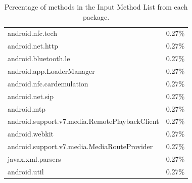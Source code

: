\documentclass{sig-alternate}
\begin{document}
\begin{table}
\begin{tabular}{|l|l|}
android.nfc.tech & 0.27\% \\ 
android.net.http & 0.27\% \\ 
android.bluetooth.le & 0.27\% \\ 
android.app.LoaderManager & 0.27\% \\ 
android.nfc.cardemulation & 0.27\% \\ 
android.net.sip & 0.27\% \\ 
android.mtp & 0.27\% \\ 
android.support.v7.media.RemotePlaybackClient & 0.27\% \\ 
android.webkit & 0.27\% \\ 
android.support.v7.media.MediaRouteProvider & 0.27\% \\ 
javax.xml.parsers & 0.27\% \\ 
android.util & 0.27\% \\ 

\hline
\end{tabular}

\caption{Percentage of methods in the Input Method List from each package.}

\end{table}
\end{document}
